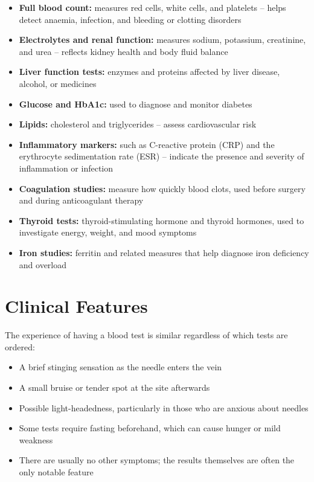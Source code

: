 \begin{itemize}
    \item \textbf{Full blood count:} measures red cells, white cells, and platelets -- helps detect anaemia, infection, and bleeding or clotting disorders
    \item \textbf{Electrolytes and renal function:} measures sodium, potassium, creatinine, and urea -- reflects kidney health and body fluid balance
    \item \textbf{Liver function tests:} enzymes and proteins affected by liver disease, alcohol, or medicines
    \item \textbf{Glucose and HbA1c:} used to diagnose and monitor diabetes
    \item \textbf{Lipids:} cholesterol and triglycerides -- assess cardiovascular risk
    \item \textbf{Inflammatory markers:} such as C-reactive protein (CRP) and the erythrocyte sedimentation rate (ESR) -- indicate the presence and severity of inflammation or infection
    \item \textbf{Coagulation studies:} measure how quickly blood clots, used before surgery and during anticoagulant therapy
    \item \textbf{Thyroid tests:} thyroid-stimulating hormone and thyroid hormones, used to investigate energy, weight, and mood symptoms
    \item \textbf{Iron studies:} ferritin and related measures that help diagnose iron deficiency and overload
\end{itemize}

\section*{Clinical Features}
The experience of having a blood test is similar regardless of which tests are ordered:

\begin{itemize}
    \item A brief stinging sensation as the needle enters the vein
    \item A small bruise or tender spot at the site afterwards
    \item Possible light-headedness, particularly in those who are anxious about needles
    \item Some tests require fasting beforehand, which can cause hunger or mild weakness
    \item There are usually no other symptoms; the results themselves are often the only notable feature
\end{itemize}

